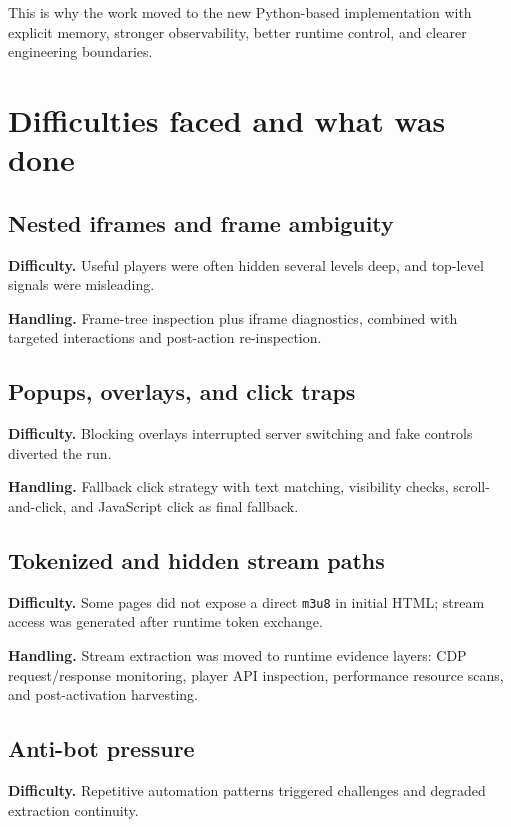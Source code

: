 This is why the work moved to the new Python-based implementation with explicit memory,
stronger observability, better runtime control, and clearer engineering boundaries.

\section{Difficulties faced and what was done}

\subsection{Nested iframes and frame ambiguity}

\textbf{Difficulty.} Useful players were often hidden several levels deep, and top-level
signals were misleading.

\textbf{Handling.} Frame-tree inspection plus iframe diagnostics, combined with targeted
interactions and post-action re-inspection.

\subsection{Popups, overlays, and click traps}

\textbf{Difficulty.} Blocking overlays interrupted server switching and fake controls
diverted the run.

\textbf{Handling.} Fallback click strategy with text matching, visibility checks,
scroll-and-click, and JavaScript click as final fallback.

\subsection{Tokenized and hidden stream paths}

\textbf{Difficulty.} Some pages did not expose a direct \texttt{m3u8} in initial HTML;
stream access was generated after runtime token exchange.

\textbf{Handling.} Stream extraction was moved to runtime evidence layers: CDP
request/response monitoring, player API inspection, performance resource scans, and
post-activation harvesting.

\subsection{Anti-bot pressure}

\textbf{Difficulty.} Repetitive automation patterns triggered challenges and degraded
extraction continuity.

